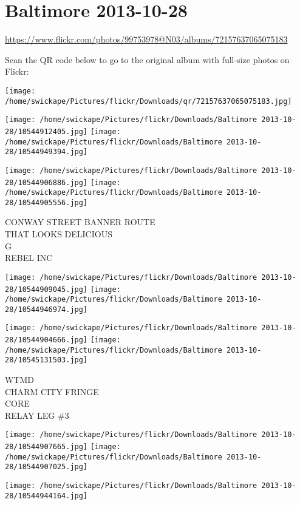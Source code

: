 \documentclass[10pt,letterpaper]{article}
\title{}
\author{}
\date{}
\begin{document}
\section*{Baltimore 2013-10-28}

\url{https://www.flickr.com/photos/99753978@N03/albums/72157637065075183}

Scan the QR code below to go to the original album with full-size photos on Flickr:

\texttt{[image: /home/swickape/Pictures/flickr/Downloads/qr/72157637065075183.jpg]}
\pagebreak

\texttt{[image: /home/swickape/Pictures/flickr/Downloads/Baltimore 2013-10-28/10544912405.jpg]}
\texttt{[image: /home/swickape/Pictures/flickr/Downloads/Baltimore 2013-10-28/10544949394.jpg]}

\texttt{[image: /home/swickape/Pictures/flickr/Downloads/Baltimore 2013-10-28/10544906886.jpg]}
\texttt{[image: /home/swickape/Pictures/flickr/Downloads/Baltimore 2013-10-28/10544905556.jpg]}

CONWAY STREET BANNER ROUTE\\
THAT LOOKS DELICIOUS\\
G\\
REBEL INC
\pagebreak

\texttt{[image: /home/swickape/Pictures/flickr/Downloads/Baltimore 2013-10-28/10544909045.jpg]}
\texttt{[image: /home/swickape/Pictures/flickr/Downloads/Baltimore 2013-10-28/10544946974.jpg]}

\texttt{[image: /home/swickape/Pictures/flickr/Downloads/Baltimore 2013-10-28/10544904666.jpg]}
\texttt{[image: /home/swickape/Pictures/flickr/Downloads/Baltimore 2013-10-28/10545131503.jpg]}

WTMD\\
CHARM CITY FRINGE\\
CORE\\
RELAY LEG \#3
\pagebreak

\texttt{[image: /home/swickape/Pictures/flickr/Downloads/Baltimore 2013-10-28/10544907665.jpg]}
\texttt{[image: /home/swickape/Pictures/flickr/Downloads/Baltimore 2013-10-28/10544907025.jpg]}

\vspace{0.25in}
\texttt{[image: /home/swickape/Pictures/flickr/Downloads/Baltimore 2013-10-28/10544944164.jpg]}
\end{document}
